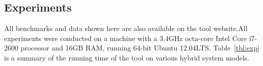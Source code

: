 \subsection{Experiments}\label{sec:exp}


All benchmarks and data shown here are also available on the tool
website.All experiments were conducted on a machine with a 3.4GHz
octa-core Intel Core i7-2600 processor and 16GB RAM, running 64-bit
Ubuntu 12.04LTS. Table~\ref{tbl:exp} is a summary of the running time
of the tool on various hybrid system models.

